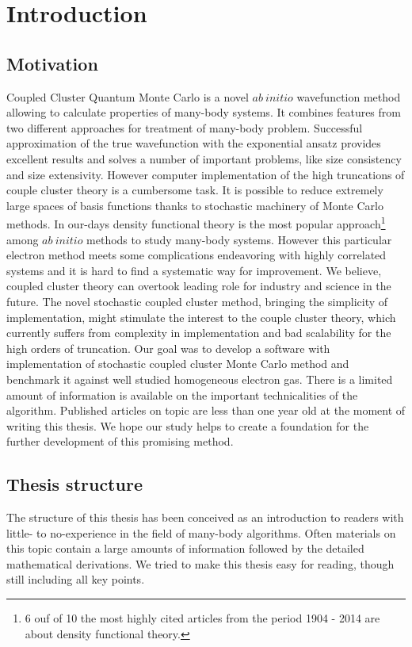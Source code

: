 \documentclass[twoside,english]{uiofysmaster}
\begin{document}
	\tableofcontents
	
\chapter{Introduction}
	
\section{Motivation }
Coupled Cluster Quantum Monte Carlo is a novel $ab\ initio$ wavefunction method allowing to calculate properties of many-body systems. 
It combines features from two different approaches for treatment of many-body problem. Successful approximation of the true wavefunction with the exponential ansatz provides excellent results and solves a number of important problems, like size consistency and size extensivity. However computer implementation of the high truncations of couple cluster theory is a cumbersome task. It is possible to reduce extremely large spaces of basis functions thanks to stochastic machinery of Monte Carlo methods.
In our-days density functional theory is the most popular approach\footnote{6 ouf of 10 the most highly cited articles from the period 1904 - 2014 are about density functional theory\cite{httpphysicsdatabasecom}.} among $ab\ initio$ methods to study many-body systems. However this particular electron method meets some complications endeavoring with highly correlated systems and it is hard to find a systematic way for improvement. We believe, coupled cluster theory can overtook leading role for industry and science in the future. 
The novel stochastic coupled cluster method, bringing the simplicity of implementation, might stimulate the interest to the couple cluster theory, which currently suffers from complexity in implementation and bad scalability for the high orders of truncation. 
Our goal was to develop a software with implementation of stochastic coupled cluster Monte Carlo method and benchmark it against well studied homogeneous electron gas. There is a limited amount of information is available on the important technicalities of the algorithm. Published articles on topic are less than one year old at the moment of writing this thesis. We hope our study helps to create a foundation for the further development of this promising method.



\section{Thesis structure}
The structure of this thesis has been conceived as an introduction to readers with little- to no-experience in the field of many-body algorithms. Often materials on this topic contain a large amounts of information followed by the detailed mathematical derivations. We tried to make this thesis easy for reading, though still including all key points.
\end{document}
